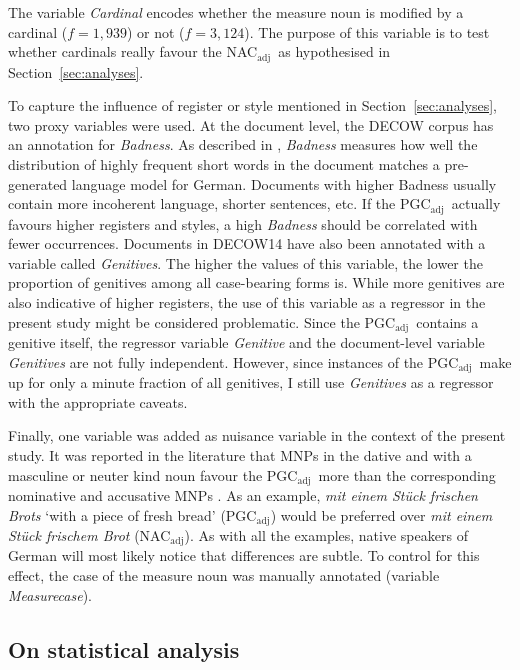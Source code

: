 \documentclass[USenglish]{article}
\newcommand{\Sub}[1]{\ensuremath{\mathrm{_{#1}}}}
\newcommand{\NACa}{NAC\Sub{adj}}
\newcommand{\PGCa}{PGC\Sub{adj}}
\begin{document}
The variable \textit{Cardinal} encodes whether the measure noun is modified by a cardinal ($f=1,939$) or not ($f=3,124$).
The purpose of this variable is to test whether cardinals really favour the \NACa\ as hypothesised in Section~\ref{sec:analyses}.

To capture the influence of register or style mentioned in Section~\ref{sec:analyses}, two proxy variables were used.
At the document level, the DECOW corpus has an annotation for \textit{Badness}.
As described in \cite{SchaeferEa2013}, \textit{Badness} measures how well the distribution of highly frequent short words in the document matches a pre-generated language model for German.
Documents with higher Badness usually contain more incoherent language, shorter sentences, etc.
If the \PGCa\ actually favours higher registers and styles, a high \textit{Badness} should be correlated with fewer occurrences.
Documents in DECOW14 have also been annotated with a variable called \textit{Genitives}.
The higher the values of this variable, the lower the proportion of genitives among all case-bearing forms is.
While more genitives are also indicative of higher registers, the use of this variable as a regressor in the present study might be considered problematic.
Since the \PGCa\ contains a genitive itself, the regressor variable \textit{Genitive} and the document-level variable \textit{Genitives} are not fully independent.
However, since instances of the \PGCa\ make up for only a minute fraction of all genitives, I still use \textit{Genitives} as a regressor with the appropriate caveats.

Finally, one variable was added as nuisance variable in the context of the present study.
It was reported in the literature that MNPs in the dative and with a masculine or neuter kind noun favour the \PGCa\ more than the corresponding nominative and accusative MNPs \citep{Hentschel1993,Zimmer2015}.
As an example, \textit{mit einem Stück frischen Brots} `with a piece of fresh bread' (\PGCa) would be preferred over \textit{mit einem Stück frischem Brot} (\NACa).
As with all the examples, native speakers of German will most likely notice that differences are subtle.
To control for this effect, the case of the measure noun was manually annotated (variable \textit{Measurecase}).



\subsection{On statistical analysis}
\label{sec:rightstatistics}
\end{document}
